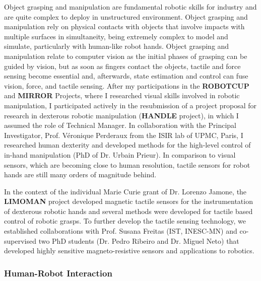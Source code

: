 \documentclass[
]{article}
\begin{document}
Object grasping and manipulation are fundamental robotic skills for
industry and are quite complex to deploy in unstructured environment.
Object grasping and manipulation rely on physical contacts with objects
that involve impacts with multiple surfaces in simultaneity, being
extremely complex to model and simulate, particularly with human-like
robot hands. Object grasping and manipulation relate to computer vision
as the initial phases of grasping can be guided by vision, but as soon
as fingers contact the objects, tactile and force sensing become
essential and, afterwards, state estimation and control can fuse vision,
force, and tactile sensing. After my participations in the
\textbf{ROBOTCUP} and \textbf{MIRROR} Projects, where I researched
visual skills involved in robotic manipulation, I participated actively
in the resubmission of a project proposal for research in dexterous
robotic manipulation (\textbf{HANDLE} project), in which I assumed the
role of Technical Manager. In collaboration with the Principal
Investigator, Prof. Véronique Perderaux from the ISIR lab of UPMC,
Paris, I researched human dexterity and developed methods for the
high-level control of in-hand manipulation (PhD of Dr. Urbain Prieur).
In comparison to visual sensors, which are becoming close to human
resolution, tactile sensors for robot hands are still many orders of
magnitude behind.

In the context of the individual Marie Curie grant of Dr. Lorenzo
Jamone, the \textbf{LIMOMAN} project developed magnetic tactile sensors
for the instrumentation of dexterous robotic hands and several methods
were developed for tactile based control of robotic grasps. To further
develop the tactile sensing technology, we established collaborations
with Prof. Susana Freitas (IST, INESC-MN) and co-supervised two PhD
students (Dr. Pedro Ribeiro and Dr. Miguel Neto) that developed highly
sensitive magneto-resistive sensors and applications to robotics.

\subsubsection*{Human-Robot Interaction}\label{human-robot-interaction}
\end{document}
